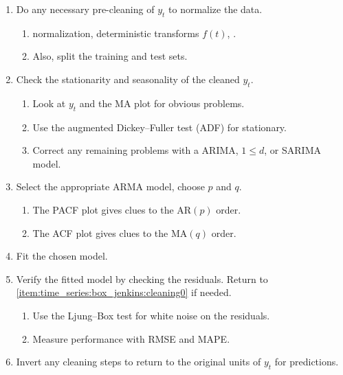 \begin{enumerate}[noitemsep]
  \item Do any necessary pre-cleaning of $y_{t}$ to normalize the data.\label{item:time_series:box_jenkins:cleaning0}
  \begin{enumerate}[noitemsep]
    \item \Zscore normalization, deterministic transforms $f\left(t\right)$, \etc.\label{item:time_series:box_jenkins:cleaning0:detail}
    \item Also, split the training and test sets.\label{item:time_series:box_jenkins:cleaning0:train_test_split}
  \end{enumerate}
  \item Check the stationarity and seasonality of the cleaned $y_{t}$.\label{item:time_series:box_jenkins:assumptions}
  \begin{enumerate}[noitemsep]
    \item Look at $y_{t}$ and the MA plot for obvious problems.\label{item:time_series:box_jenkins:assumptions:eye}
    \item Use the augmented Dickey--Fuller test (ADF) for stationary.\label{item:time_series:box_jenkins:assumptions:ADF}
    \item Correct any remaining problems with a ARIMA, $1 \leq d$, or SARIMA model.\label{item:time_series:box_jenkins:assumptions:cleaning1}
  \end{enumerate}
  \item Select the appropriate ARMA model, \ie choose $p$ and $q$.\label{item:time_series:box_jenkins:order}
  \begin{enumerate}[noitemsep]
    \item The PACF plot gives clues to the $\text{AR}\left(p\right)$ order.\label{item:time_series:box_jenkins:order:PACF}
    \item The ACF plot gives clues to the $\text{MA}\left(q\right)$ order.\label{item:time_series:box_jenkins:order:ACF}
  \end{enumerate}
  \item Fit the chosen model.\label{item:time_series:box_jenkins:fit}
  \item Verify the fitted model by checking the residuals. Return to \cref{item:time_series:box_jenkins:cleaning0} if needed.\label{item:time_series:box_jenkins:verify}
  \begin{enumerate}[noitemsep]
    \item Use the Ljung--Box test for white noise on the residuals.\label{item:time_series:box_jenkins:verify:Ljung_Box}
    \item Measure performance with RMSE and MAPE.\label{item:time_series:box_jenkins:verify:RMSE_MAPE}
  \end{enumerate}
  \item Invert any cleaning steps to return to the original units of $y_{t}$ for predictions.\label{item:time_series:box_jenkins:invert}
\end{enumerate}

